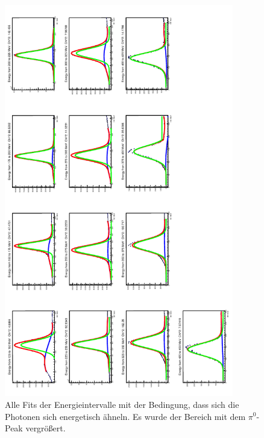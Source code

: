 \documentclass[a4paper,11pt,oneside,final,german,openbib,pdftex]{scrbook}
\begin{document}
{\begin{appendix}
\begin{figure}[h!]
	\begin{center}
		\includegraphics[width=100mm]{20170405StrahlzeitNoCutAllFits}
		\caption[Strahlzeit: Alle Fits keine weiteren Bedingungen]{Alle Fits der Energieintervalle mit der Bedingung, dass sich die Photonen sich energetisch ähneln. Es wurde der Bereich mit dem $\pi^0$-Peak vergr\"o{\ss}ert.}
		\label{fig:similarenergyallfitsuncharged}
	\end{center}
\end{figure}

\end{appendix}}
\end{document}
